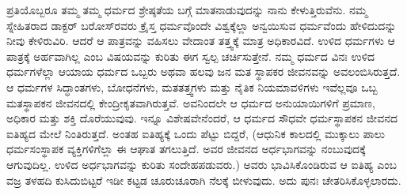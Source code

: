 ಪ್ರತಿಯೊಬ್ಬರೂ ತಮ್ಮ ತಮ್ಮ ಧರ್ಮದ ಶ್ರೇಷ್ಠತೆಯ ಬಗ್ಗೆ ಮಾತನಾಡುವುದನ್ನು ನಾನು ಕೇಳುತ್ತಿರುವೆನು. ನಮ್ಮ ಸ್ನೇಹಿತರಾದ ಡಾಕ್ಟರ್​ ಬರೋಸ್​ರವರು ಕ್ರೈಸ್ತ ಧರ್ಮವೊಂದೇ ವಿಶ್ವಕ್ಕೆಲ್ಲಾ ಅನ್ವಯಿಸುವ ಧರ್ಮವೆಂದು ಹೇಳಿದುದನ್ನು ನೀವು ಕೇಳಿರುವಿರಿ. ಆದರೆ ಆ ಪಾತ್ರವನ್ನು ವಹಿಸಲು ವೇದಾಂತ ತತ್ತ್ವಕ್ಕೆ ಮಾತ್ರ ಅಧಿಕಾರವಿದೆ. ಉಳಿದ ಧರ್ಮಗಳು ಆ ಪಾತ್ರಕ್ಕೆ ಅರ್ಹವಾಗಿಲ್ಲ ಎಂಬ ವಿಷಯವನ್ನು ಕುರಿತು ಈಗ ಸ್ವಲ್ಪ ಚರ್ಚಿಸುತ್ತೇನೆ. ನಮ್ಮ ಧರ್ಮದ ವಿನಃ ಉಳಿದ ಧರ್ಮಗಳೆಲ್ಲಾ ಆಯಾಯ ಧರ್ಮದ ಒಬ್ಬರು ಅಥವಾ ಹಲವು ಜನ ಮತ ಸ್ಥಾಪಕರ ಜೀವನವನ್ನು ಅವಲಂಬಿಸಿರುತ್ತದೆ. ಆ ಧರ್ಮಗಳ ಸಿದ್ಧಾಂತಗಳು, ಬೋಧನೆಗಳು, ಮತತತ್ತ್ವಗಳು ಮತ್ತು ನೈತಿಕ ನಿಯಮಾವಳಿಗಳು ಇವೆಲ್ಲವೂ ಒಬ್ಬ ಮತಸ್ಥಾಪಕನ ಜೀವನದಲ್ಲಿ ಕೇಂದ್ರೀಕೃತವಾಗಿರುತ್ತವೆ. ಅವನಿಂದಲೇ ಆ ಧರ್ಮದ ಅನುಯಾಯಿಗಳಿಗೆ ಪ್ರಮಾಣ, ಅಧಿಕಾರ ಮತ್ತು ಶಕ್ತಿ ದೊರೆಯುವುವು. ಇನ್ನೂ ವಿಶೇಷವೇನೆಂದರೆ, ಆ ಧರ್ಮದ ಸೌಧವೇ ಧರ್ಮಸ್ಥಾಪಕನ ಜೀವನದ ಐತಿಹ್ಯದ ಮೇಲೆ ನಿಂತಿರುತ್ತದೆ. ಅಂತಹ ಐತಿಹ್ಯಕ್ಕೆ ಒಂದು ಪೆಟ್ಟು ಬಿದ್ದರೆ, (ಆಧುನಿಕ ಕಾಲದಲ್ಲಿ ಮುಕ್ಕಾಲು ಪಾಲು ಧರ್ಮಸಂಸ್ಥಾಪಕ ವ್ಯಕ್ತಿಗಳಿಗೆಲ್ಲಾ ಈ ಆಘಾತ ತಗಲುತ್ತಿದೆ. ಅವರ ಜೀವನದ ಅರ್ಧಭಾಗವನ್ನು ನಂಬುವುದಕ್ಕೆ ಆಗುವುದಿಲ್ಲ. ಉಳಿದ ಅರ್ಧಭಾಗವನ್ನು ಕುರಿತು ಸಂದೇಹಪಡುವರು.) ಅವರು ಭಾವಿಸಿಕೊಂಡಿರುವ ಆ ಐತಿಹ್ಯ ಎಂಬ ವಜ್ರ ತಳಹದಿ ಕುಸಿದುಬಿಟ್ಟರೆ ಇಡೀ ಕಟ್ಟಡ ಚೂರುಚೂರಾಗಿ ನೆಲಕ್ಕೆ ಬೀಳುವುದು. ಅದು ಪುನಃ ಚೇತರಿಸಿಕೊಳ್ಳಲಾರದು.

